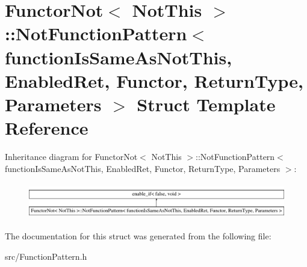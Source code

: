 \hypertarget{struct_functor_not_1_1_not_function_pattern}{\section{Functor\-Not$<$ Not\-This $>$\-:\-:Not\-Function\-Pattern$<$ function\-Is\-Same\-As\-Not\-This, Enabled\-Ret, Functor, Return\-Type, Parameters $>$ Struct Template Reference}
\label{struct_functor_not_1_1_not_function_pattern}
}
Inheritance diagram for Functor\-Not$<$ Not\-This $>$\-:\-:Not\-Function\-Pattern$<$ function\-Is\-Same\-As\-Not\-This, Enabled\-Ret, Functor, Return\-Type, Parameters $>$\-:\begin{figure}[H]
\begin{center}
\leavevmode
\includegraphics[height=1.595442cm]{struct_functor_not_1_1_not_function_pattern}
\end{center}
\end{figure}


The documentation for this struct was generated from the following file\-:\begin{DoxyCompactItemize}
\item 
src/Function\-Pattern.\-h\end{DoxyCompactItemize}
